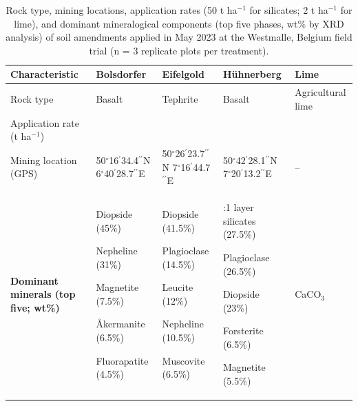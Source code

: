 \documentclass[preprint,12pt]{elsarticle}
\begin{document}
\begin{landscape}
\begin{table}[p]
\centering
\caption{Rock type, mining locations, application rates (50 t ha$^{-1}$ for silicates; 2 t ha$^{-1}$ for lime), and dominant mineralogical components (top five phases, wt\% by XRD analysis) of soil amendments applied in May 2023 at the Westmalle, Belgium field trial (n = 3 replicate plots per treatment).}
\label{tab:amendment_origins}
\small

\clearpage

\begin{tabular}{
>{\raggedright\arraybackslash}p{4.0cm}
>{\raggedright\arraybackslash}p{4.5cm}
>{\raggedright\arraybackslash}p{4.5cm}
>{\raggedright\arraybackslash}p{4.5cm}
>{\raggedright\arraybackslash}p{3.0cm}
}
\hline
\textbf{Characteristic}
& \textbf{Bolsdorfer}
& \textbf{Eifelgold}
& \textbf{H\"uhnerberg}
& \textbf{Lime} \\
\hline

Rock type
& Basalt
& Tephrite
& Basalt
& Agricultural lime \\

Application rate (t ha$^{-1}$)
& 50
& 50
& 50
& 2 \\

Mining location (GPS)
& \makecell[l]{50$^{\circ}$16$^{\prime}$34.4$^{\prime\prime}$N\\
6$^{\circ}$40$^{\prime}$28.7$^{\prime\prime}$E}
& \makecell[l]{50$^{\circ}$26$^{\prime}$23.7$^{\prime\prime}$N\\
7$^{\circ}$16$^{\prime}$44.7$^{\prime\prime}$E}
& \makecell[l]{50$^{\circ}$42$^{\prime}$28.1$^{\prime\prime}$N\\
7$^{\circ}$20$^{\prime}$13.2$^{\prime\prime}$E}
& -- \\

\hline
\textbf{Dominant minerals (top five; wt\%)}
&
Diopside (45\%) \par
Nepheline (31\%) \par
Magnetite (7.5\%) \par
\AA kermanite (6.5\%) \par
Fluorapatite (4.5\%)
&
Diopside (41.5\%) \par
Plagioclase (14.5\%) \par
Leucite (12\%) \par
Nepheline (10.5\%) \par
Muscovite (6.5\%)
&
2:1 layer silicates (27.5\%) \par
Plagioclase (26.5\%) \par
Diopside (23\%) \par
Forsterite (6.5\%) \par
Magnetite (5.5\%)
&
CaCO$_3$ \\

\hline
\end{tabular}
\end{table}
\end{landscape}
\end{document}
